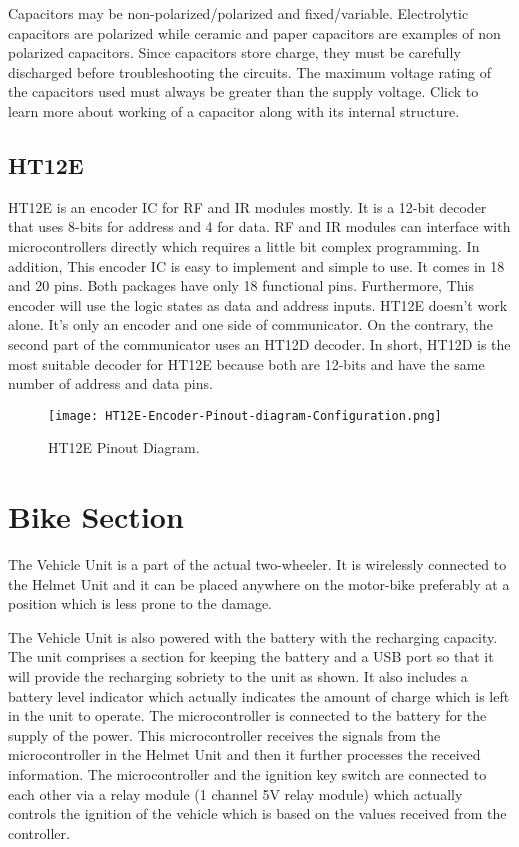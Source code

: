 Capacitors may be non-polarized/polarized and fixed/variable. Electrolytic capacitors are polarized while ceramic and paper capacitors are examples of non polarized capacitors. Since capacitors store charge, they must be carefully discharged before troubleshooting the circuits. The maximum voltage rating of the capacitors used must always be greater than the supply voltage. Click to learn more about working of a capacitor along with its internal structure.

\subsection{HT12E}
HT12E is an encoder IC for RF and IR modules mostly. It is a 12-bit decoder that uses 8-bits for address and 4 for data. RF and IR modules can interface with microcontrollers directly which requires a little bit complex programming. In addition, This encoder IC is easy to implement and simple to use. It comes in 18 and 20 pins. Both packages have only 18 functional pins. Furthermore, This encoder will use the logic states as data and address inputs. HT12E doesn’t work alone. It’s only an encoder and one side of communicator. On the contrary,  the second part of the communicator uses an HT12D decoder. In short, HT12D is the most suitable decoder for HT12E because both are 12-bits and have the same number of address and data pins.
\begin{figure}[h]
	\centering
	\texttt{[image: HT12E-Encoder-Pinout-diagram-Configuration.png]}
	\caption{HT12E Pinout Diagram.}
\end{figure}
\pagebreak
\section{Bike Section}

The Vehicle Unit is a part of the actual two-wheeler. It is wirelessly connected to the Helmet Unit and it can be placed anywhere on the motor-bike preferably at a position which is less prone to the damage.\vspace{.3cm}



The Vehicle Unit is also powered with the battery with the recharging capacity. The unit comprises a section for keeping the battery and a USB port so that it will provide the recharging sobriety to the unit as shown. It also includes a battery level indicator which actually indicates the amount of charge which is left in the unit to operate. The microcontroller is connected to the battery for the supply of the power. This microcontroller receives the signals from the microcontroller in the Helmet Unit and then it further processes the received information. The microcontroller and the ignition key switch are connected to each other via a relay module (1 channel 5V relay module) which actually controls the ignition of the vehicle which is based on the values received from the controller.

